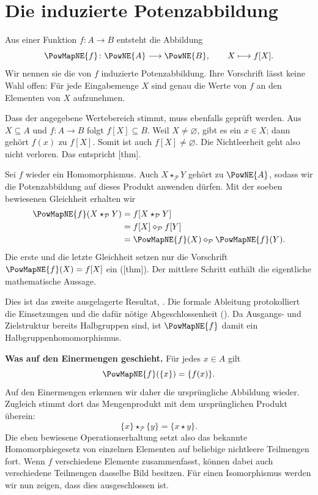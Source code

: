 \section*{Die induzierte Potenzabbildung}
\hypertarget{power-isomorphisms.reading.operation}{}

Aus einer Funktion \(f\colon A\to B\) entsteht die Abbildung
\[
  \PowMapNE{f}\colon\PowNE{A}\longrightarrow\PowNE{B},
  \qquad X\longmapsto f[X].
\]
Wir nennen sie die von \(f\) induzierte Potenzabbildung.
Ihre Vorschrift lässt keine Wahl offen: Für jede Eingabemenge \(X\)
sind genau die Werte von \(f\) an den Elementen von \(X\) aufzunehmen.

Dass der angegebene Wertebereich stimmt, muss ebenfalls geprüft werden.
Aus \(X\subseteq A\) und \(f\colon A\to B\) folgt \(f[X]\subseteq B\).
Weil \(X\ne\varnothing\), gibt es ein \(x\in X\); dann gehört
\(f(x)\) zu \(f[X]\). Somit ist auch \(f[X]\ne\varnothing\).
Die Nichtleerheit geht also nicht verloren. Das entspricht
[thm].

Sei \(f\) wieder ein Homomorphismus. Auch
\(X\star_{\mathcal P}Y\) gehört zu \(\PowNE{A}\), sodass wir die
Potenzabbildung auf dieses Produkt anwenden dürfen. Mit der soeben
bewiesenen Gleichheit erhalten wir
\[
  \begin{aligned}
    \PowMapNE{f}(X\star_{\mathcal P}Y)
      &=f[X\star_{\mathcal P}Y]\\
      &=f[X]\diamond_{\mathcal P}f[Y]\\
      &=\PowMapNE{f}(X)\diamond_{\mathcal P}\PowMapNE{f}(Y).
  \end{aligned}
\]
Die erste und die letzte Gleichheit setzen nur die Vorschrift
\(\PowMapNE{f}(X)=f[X]\) ein
([thm]). Der mittlere Schritt
enthält die eigentliche mathematische Aussage.

Dies ist das zweite ausgelagerte Resultat,
.
Die formale Ableitung protokolliert die Einsetzungen und die dafür
nötige Abgeschlossenheit
().
Da Ausgangs- und Zielstruktur bereits Halbgruppen sind, ist
\(\PowMapNE{f}\) damit ein Halbgruppenhomomorphismus.

\medskip\noindent\textbf{Was auf den Einermengen geschieht.}
Für jedes \(x\in A\) gilt
\[
  \PowMapNE{f}(\{x\})=\{f(x)\}.
\]
Auf den Einermengen erkennen wir daher die ursprüngliche Abbildung
wieder. Zugleich stimmt dort das Mengenprodukt mit dem ursprünglichen
Produkt überein:
\[
  \{x\}\star_{\mathcal P}\{y\}=\{x\star y\}.
\]
Die eben bewiesene Operationserhaltung setzt also das bekannte
Homomorphiegesetz von einzelnen Elementen auf beliebige nichtleere
Teilmengen fort. Wenn \(f\) verschiedene Elemente zusammenfasst,
können dabei auch verschiedene Teilmengen dasselbe Bild besitzen.
Für einen Isomorphismus werden wir nun zeigen, dass dies ausgeschlossen ist.

